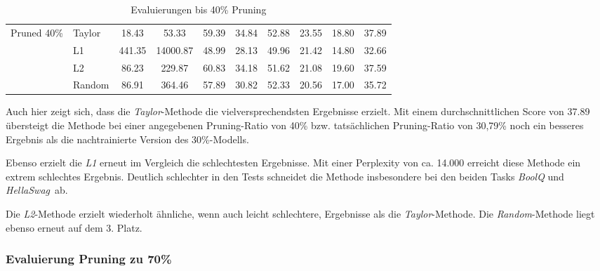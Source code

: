 \begin{table}[h]
{\begin{tabular}{l l | c c | c c c c c | r}
			\multirow{4}{*}{Pruned 40\%} & Taylor          & 18.43              & 53.33
			                             & 59.39           & 34.84              & 52.88
			                             & 23.55           & 18.80              & 37.89            \\

			                             & L1              & 441.35             & 14000.87
			                             & 48.99           & 28.13              & 49.96
			                             & 21.42           & 14.80              & 32.66            \\


			                             & L2              & 86.23              & 229.87
			                             & 60.83           & 34.18              & 51.62
			                             & 21.08           & 19.60              & 37.59            \\


			                             & Random          & 86.91              & 364.46
			                             & 57.89           & 30.82              & 52.33
			                             & 20.56           & 17.00              & 35.72            \\
			\bottomrule
			\bottomrule
		\end{tabular}}
	\caption{Evaluierungen bis 40\% Pruning}
	\label{tab:pruning40}
\end{table}

Auch hier zeigt sich, dass die \emph{Taylor}-Methode die vielversprechendsten
Ergebnisse erzielt. Mit einem durchschnittlichen Score von 37.89 übersteigt die
Methode bei einer angegebenen Pruning-Ratio von 40\% bzw. tatsächlichen
Pruning-Ratio von 30,79\% noch ein besseres Ergebnis als die nachtrainierte
Version des 30\%-Modells.

Ebenso erzielt die \emph{L1} erneut im Vergleich die schlechtesten Ergebnisse.
Mit einer Perplexity von ca. 14.000 erreicht diese Methode ein extrem schlechtes
Ergebnis. Deutlich schlechter in den Tests schneidet die Methode insbesondere
bei den beiden Tasks \emph{BoolQ} und \emph{HellaSwag} ab.

Die \emph{L2}-Methode erzielt wiederholt ähnliche, wenn auch leicht schlechtere,
Ergebnisse als die \emph{Taylor}-Methode. Die \emph{Random}-Methode liegt ebenso
erneut auf dem 3. Platz.

\newpage

\subsubsection{Evaluierung Pruning zu 70\%}

